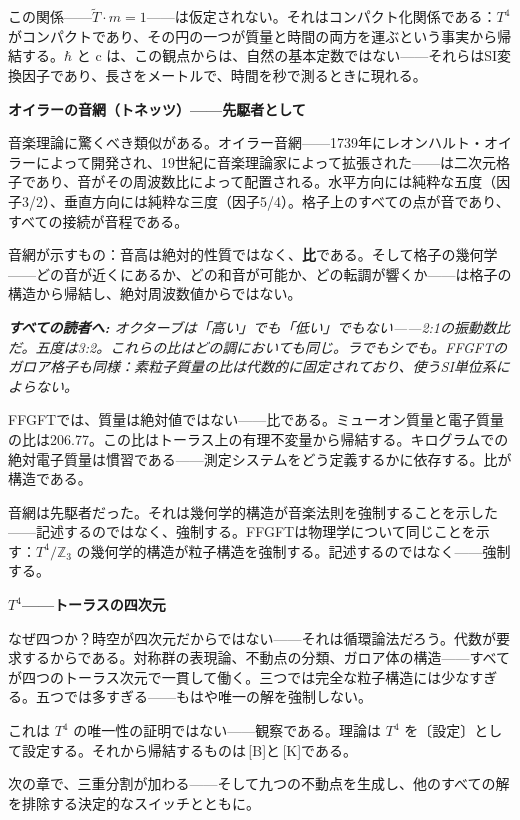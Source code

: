 \documentclass[11pt,openany]{book}
\newcommand{\status}[1]{\penalty10000\,{\tiny\textcolor{gray!70}{[#1]}}}
\newenvironment{laierspur}{%
  \par\vspace{4pt}%
  \noindent\small\itshape\color{blue!60!black}%
  \textbf{すべての読者へ:}\enspace\ignorespaces}{%
  \par\vspace{4pt}\normalsize\normalfont\normalcolor}
\begin{document}
この関係——$\tilde{T}\cdot m = 1$——は仮定されない。それはコンパクト化関係である：$T^4$ がコンパクトであり、その円の一つが質量と時間の両方を運ぶという事実から帰結する。$\hbar$ と c は、この観点からは、自然の基本定数ではない——それらはSI変換因子であり、長さをメートルで、時間を秒で測るときに現れる。

\textbf{オイラーの音網（トネッツ）——先駆者として}

音楽理論に驚くべき類似がある。オイラー音網——1739年にレオンハルト・オイラーによって開発され、19世紀に音楽理論家によって拡張された——は二次元格子であり、音がその周波数比によって配置される。水平方向には純粋な五度（因子3/2）、垂直方向には純粋な三度（因子5/4）。格子上のすべての点が音であり、すべての接続が音程である。

音網が示すもの：音高は絶対的性質ではなく、\textbf{比}である。そして格子の幾何学——どの音が近くにあるか、どの和音が可能か、どの転調が響くか——は格子の構造から帰結し、絶対周波数値からではない。

\begin{laierspur}
オクターブは「高い」でも「低い」でもない——2:1の振動数比だ。五度は3:2。これらの比はどの調においても同じ。ラでもシでも。FFGFTのガロア格子も同様：素粒子質量の比は代数的に固定されており、使うSI単位系によらない。
\end{laierspur}

FFGFTでは、質量は絶対値ではない——比である。ミューオン質量と電子質量の比は206.77。この比はトーラス上の有理不変量から帰結する。キログラムでの絶対電子質量は慣習である——測定システムをどう定義するかに依存する。比が構造である。

音網は先駆者だった。それは幾何学的構造が音楽法則を強制することを示した——記述するのではなく、強制する。FFGFTは物理学について同じことを示す：$T^4/\mathbb{Z}_3$ の幾何学的構造が粒子構造を強制する。記述するのではなく——強制する。

\textbf{$T^4$——トーラスの四次元}

なぜ四つか？時空が四次元だからではない——それは循環論法だろう。代数が要求するからである。対称群の表現論、不動点の分類、ガロア体の構造——すべてが四つのトーラス次元で一貫して働く。三つでは完全な粒子構造には少なすぎる。五つでは多すぎる——もはや唯一の解を強制しない。

これは $T^4$ の唯一性の証明ではない——観察である。理論は $T^4$ を〔設定〕として設定する。それから帰結するものは\status{B}と\status{K}である。

次の章で、三重分割が加わる——そして九つの不動点を生成し、他のすべての解を排除する決定的なスイッチとともに。
\end{document}
